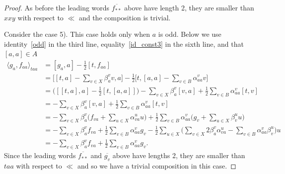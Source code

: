 \documentclass[10pt,a4paper]{amsart}
\begin{document}
\begin{proof}
As  before the leading words $\overline{f_{**}}$ above have length  2, they are smaller than $xxy$   with respect to $\ll$ and the composition is trivial.

Consider the case 5). This case holds only when $a$ is odd. Below we use identity~\eqref{odd} in the third line,
equality~\eqref{id_const3} in the sixth line, and that $[a,a]\in A$  
\begin{align*}
\langle g_a, f_{aa} \rangle_{taa}& =[g_a, a]- \frac{1}{2}[t, f_{aa}] \\
&=\Big[[t,a] - \sum_{v \in X} \beta_a^v v, a\Big]
  - \frac{1}{2}\Big[t, [a,a]-\sum_{v\in B} \alpha_{aa}^v v\Big] \\
&=\Big ([[t,a],a]-\frac 12[t, [a,a]]\Big) 
   - \sum_{v \in X} \beta_a^v [v, a]
  + \frac{1}{2}\sum_{v\in B} \alpha_{aa}^v [t,v] \\
  &  =  - \sum_{v \in X} \beta_a^v [v, a]
  + \frac{1}{2}\sum_{v\in B} \alpha_{aa}^v [t,v]  \\
&=   - \sum_{v \in X} \beta_a^v \Big(f_{va}  +  \sum_{u\in X}\alpha_{va}^u u \Big)
  + \frac{1}{2}\sum_{v\in B} \alpha_{aa}^v \Big(g_{v}  +  \sum_{u\in X}\beta_{v}^u u \Big)  \\
&=   - \sum_{v \in X} \beta_a^v  f_{va}  + \frac{1}{2}\sum_{v\in B} \alpha_{aa}^v  g_{v}
   - \frac 12\sum_{u\in X}\Big( \sum_{v\in X}2\beta_a^v \alpha_{va}^u  - \sum_{v\in B}\alpha_{aa}^v \beta_{v}^u  \Big)u  \\
&=   - \sum_{v \in X} \beta_a^v  f_{va}  + \frac{1}{2}\sum_{v\in B} \alpha_{aa}^v  g_{v}.
\end{align*}
Since the leading words $\overline{f_{**}}$ and $\overline{g_v}$ above have lengths 2, 
they are smaller than $taa$  with respect to $\ll $ and so we have a trivial composition in this case.
\end{proof}
\end{document}
